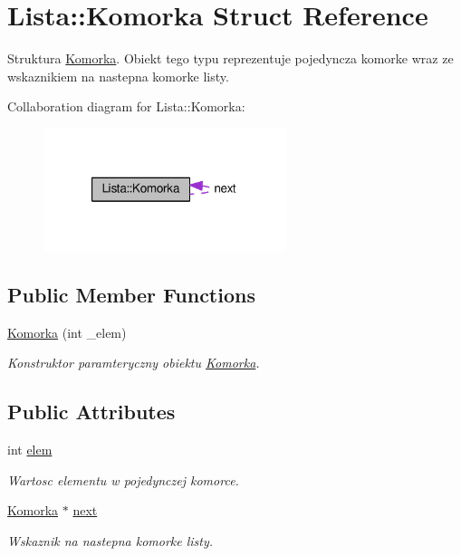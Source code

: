 \hypertarget{struct_lista_1_1_komorka}{\section{Lista\-:\-:Komorka Struct Reference}
\label{struct_lista_1_1_komorka}
}


Struktura \hyperlink{struct_lista_1_1_komorka}{Komorka}. Obiekt tego typu reprezentuje pojedyncza komorke wraz ze wskaznikiem na nastepna komorke listy.  




Collaboration diagram for Lista\-:\-:Komorka\-:\nopagebreak
\begin{figure}[H]
\begin{center}
\leavevmode
\includegraphics[width=201pt]{struct_lista_1_1_komorka__coll__graph}
\end{center}
\end{figure}
\subsection*{Public Member Functions}
\begin{DoxyCompactItemize}
\item 
\hyperlink{struct_lista_1_1_komorka_a1843c3c4ae9752cea90cfa21076f3e9c}{Komorka} (int \-\_\-elem)
\begin{DoxyCompactList}\small\item\em Konstruktor paramteryczny obiektu \hyperlink{struct_lista_1_1_komorka}{Komorka}. \end{DoxyCompactList}\end{DoxyCompactItemize}
\subsection*{Public Attributes}
\begin{DoxyCompactItemize}
\item 
int \hyperlink{struct_lista_1_1_komorka_aeb683e1dce8a8c096cc54a6645137411}{elem}
\begin{DoxyCompactList}\small\item\em Wartosc elementu w pojedynczej komorce. \end{DoxyCompactList}\item 
\hyperlink{struct_lista_1_1_komorka}{Komorka} $\ast$ \hyperlink{struct_lista_1_1_komorka_aa04e9d2ed0260f2adbff6855f7bcd77e}{next}
\begin{DoxyCompactList}\small\item\em Wskaznik na nastepna komorke listy. \end{DoxyCompactList}\end{DoxyCompactItemize}


